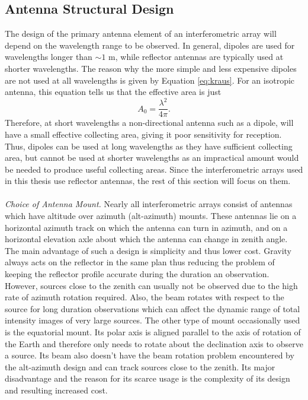 \subsection{Antenna Structural Design}\label{subsec:2.1.2}
The design of the primary antenna element of an interferometric array will depend on the wavelength range to be observed. In general, dipoles are used for wavelengths longer than $\sim 1$ m, while reflector antennas are typically used at shorter wavelengths. The reason why the more simple and less expensive dipoles are not used at all wavelengths is given by Equation \ref{eq:kraus}. For an isotropic antenna, this equation tells us that the effective area is just
\begin{equation}
A_{0} = \frac{\lambda ^2}{4\pi}.
\end{equation}
Therefore, at short wavelengths a non-directional antenna such as a dipole, will have a small effective collecting area, giving it poor sensitivity for reception. Thus, dipoles can be used at long wavelengths as they have sufficient collecting area, but cannot be used at shorter wavelengths as an impractical amount would be needed to produce useful collecting areas. Since the interferometric arrays used in this thesis use reflector antennas, the rest of this section will focus on them.\\
\\
\textit{Choice of Antenna Mount.} Nearly all interferometric arrays consist of antennas which have altitude over azimuth (alt-azimuth) mounts. These antennas lie on a horizontal azimuth track on which the antenna can turn in azimuth, and on a horizontal elevation axle about which the antenna can change in zenith angle. The main advantage of such a design is simplicity and thus lower cost. Gravity always acts on the reflector in the same plan thus reducing the problem of keeping the reflector profile accurate during the duration an observation. However, sources close to the zenith can usually not be observed due to the high rate of azimuth rotation required. Also, the beam rotates with respect to the source for long duration observations which can affect the dynamic range of total intensity images of very large sources. The other type of mount occasionally used is the equatorial mount. Its polar axis is aligned parallel to the axis of rotation of the Earth and therefore only needs to rotate about the declination axis to observe a source. Its beam also doesn't have the beam rotation problem encountered by the alt-azimuth design and can track sources close to the zenith. Its major disadvantage and the reason for its scarce usage is the complexity of its design and resulting increased cost. \\
